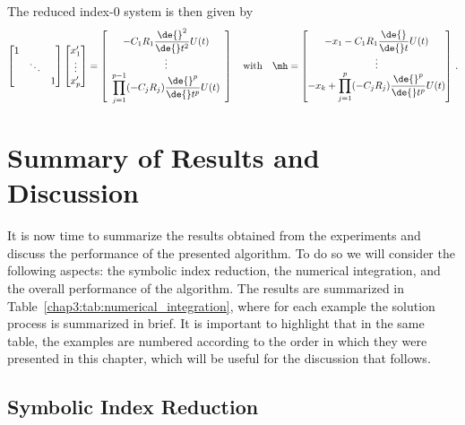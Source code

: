 %
The reduced index-0 system is then given by
%
\begin{equation*}
  \begin{bmatrix}
    1 & & \\
    & \ddots & \\
    & & 1 \\
  \end{bmatrix}
  \begin{bmatrix}
    x_1^{\prime} \\ \vdots \\ x_p^{\prime}
  \end{bmatrix} = \left[\begin{array}{c}
    -C_1R_1 \dfrac{\de{}^{2}}{\de{}t^{2}}U(t) \\
    \vdots \\
    \displaystyle\prod_{j=1}^{p-1} (-C_j R_j) \dfrac{\de{}^{p}}{\de{}t^{p}}U(t)
  \end{array}\right]
  \quad \text{with} \quad
  \mh = \begin{bmatrix}
    -x_{1} - C_1R_1 \dfrac{\de{}}{\de{}t}U(t) \\
    \vdots \\
    -x_k + \displaystyle\prod_{j=1}^{p} (-C_j R_j) \dfrac{\de{}^{p}}{\de{}t^{p}}U(t)
  \end{bmatrix} \, \text{.}
\end{equation*}
%


\section{Summary of Results and Discussion}

It is now time to summarize the results obtained from the experiments and discuss the performance of the presented algorithm. To do so we will consider the following aspects: the symbolic index reduction, the numerical integration, and the overall performance of the algorithm. The results are summarized in Table~\ref{chap3:tab:numerical_integration}, where for each example the solution process is summarized in brief. It is important to highlight that in the same table, the examples are numbered according to the order in which they were presented in this chapter, which will be useful for the discussion that follows.

\subsection{Symbolic Index Reduction}

